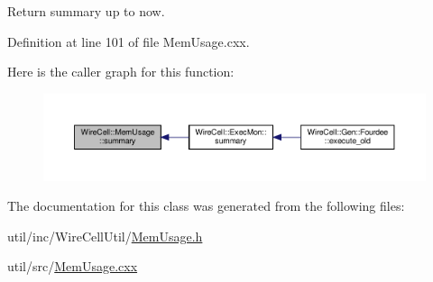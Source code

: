 Return summary up to now. 



Definition at line 101 of file Mem\+Usage.\+cxx.

Here is the caller graph for this function\+:
\nopagebreak
\begin{figure}[H]
\begin{center}
\leavevmode
\includegraphics[width=350pt]{class_wire_cell_1_1_mem_usage_acdcd1e9ea7c3e3bcb261be506eae47e9_icgraph}
\end{center}
\end{figure}


The documentation for this class was generated from the following files\+:\begin{DoxyCompactItemize}
\item 
util/inc/\+Wire\+Cell\+Util/\hyperlink{_mem_usage_8h}{Mem\+Usage.\+h}\item 
util/src/\hyperlink{_mem_usage_8cxx}{Mem\+Usage.\+cxx}\end{DoxyCompactItemize}
